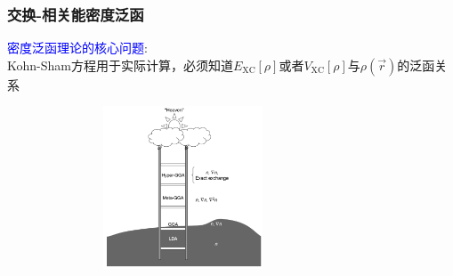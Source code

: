 \frame                               %
{
\frametitle{交换-相关能密度泛函}
\textcolor{blue}{密度泛函理论的核心问题}:\\
\textrm{Kohn-Sham}方程用于实际计算，必须知道$E_{\mathrm{XC}}[\rho]$或者$V_{\mathrm{XC}}[\rho]$与$\rho(\vec r)$的泛函关系
\vskip 5pt
\begin{minipage}[b]{0.59\textwidth}
 \hspace*{-15pt}
 \begin{itemize}
	 \setlength{\itemsep}{15pt}
		 {\fontsize{7.5pt}{6.0pt}}
 \end{itemize}
\end{minipage}
\hfill
\begin{minipage}[b]{0.39\textwidth}
\begin{figure}[h!]
\hspace*{-10pt}
\includegraphics[height=1.9in,width=3.28in,viewport=10 5 1380 700,clip]{Figures/Jacobi-ladder.png}\\
\label{Jacobi-Ladder}
\end{figure}
\end{minipage}
}

